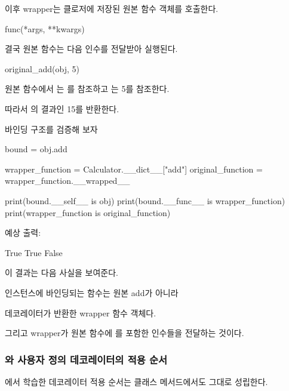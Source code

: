 이후 wrapper는 클로저에 저장된 원본  함수 객체를 호출한다.

\begin{dhkcode}
func(*args, **kwargs)
\end{dhkcode}

결국 원본 함수는 다음 인수를 전달받아 실행된다.

\begin{dhkcode}
original_add(obj, 5)
\end{dhkcode}

원본 함수에서 는 를 참조하고 는 5를 참조한다.

따라서 의 결과인 15를 반환한다.

\begin{dhknote}
\begin{dhksmry}[centered]
바인딩 구조를 검증해 보자
\end{dhksmry}
\end{dhknote}

\begin{dhkcode}
bound = obj.add

wrapper_function = Calculator.__dict__["add"]
original_function = wrapper_function.__wrapped__

print(bound.__self__ is obj)
print(bound.__func__ is wrapper_function)
print(wrapper_function is original_function)
\end{dhkcode}

예상 출력:

\begin{dhkzsh}
True
True
False
\end{dhkzsh}

이 결과는 다음 사실을 보여준다.

\begin{dhksmry}[centered]
인스턴스에 바인딩되는 함수는 원본 add가 아니라

데코레이터가 반환한 wrapper 함수 객체다.
\end{dhksmry}

그리고 wrapper가 원본 함수에 를 포함한 인수들을 전달하는 것이다.

\subsubsection{와 사용자 정의 데코레이터의 적용 순서}

에서 학습한 데코레이터 적용 순서는 클래스 메서드에서도 그대로 성립한다.

